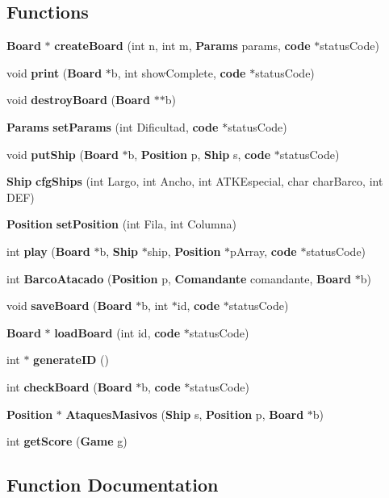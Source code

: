 \subsection*{Functions}
\begin{DoxyCompactItemize}
\item 
{\bf Board} $\ast$ {\bf create\+Board} (int n, int m, {\bf Params} params, {\bf code} $\ast$status\+Code)
\item 
void {\bf print} ({\bf Board} $\ast$b, int show\+Complete, {\bf code} $\ast$status\+Code)
\item 
void {\bf destroy\+Board} ({\bf Board} $\ast$$\ast$b)
\item 
{\bf Params} {\bf set\+Params} (int Dificultad, {\bf code} $\ast$status\+Code)
\item 
void {\bf put\+Ship} ({\bf Board} $\ast$b, {\bf Position} p, {\bf Ship} s, {\bf code} $\ast$status\+Code)
\item 
{\bf Ship} {\bf cfg\+Ships} (int Largo, int Ancho, int A\+T\+K\+Especial, char char\+Barco, int D\+EF)
\item 
{\bf Position} {\bf set\+Position} (int Fila, int Columna)
\item 
int {\bf play} ({\bf Board} $\ast$b, {\bf Ship} $\ast$ship, {\bf Position} $\ast$p\+Array, {\bf code} $\ast$status\+Code)
\item 
int {\bf Barco\+Atacado} ({\bf Position} p, {\bf Comandante} comandante, {\bf Board} $\ast$b)
\item 
void {\bf save\+Board} ({\bf Board} $\ast$b, int $\ast$id, {\bf code} $\ast$status\+Code)
\item 
{\bf Board} $\ast$ {\bf load\+Board} (int id, {\bf code} $\ast$status\+Code)
\item 
int $\ast$ {\bf generate\+ID} ()
\item 
int {\bf check\+Board} ({\bf Board} $\ast$b, {\bf code} $\ast$status\+Code)
\item 
{\bf Position} $\ast$ {\bf Ataques\+Masivos} ({\bf Ship} s, {\bf Position} p, {\bf Board} $\ast$b)
\item 
int {\bf get\+Score} ({\bf Game} g)
\end{DoxyCompactItemize}


\subsection{Function Documentation}
\label{funciones_8c_a61dcba4f41ed411eb45956ed8b5c174b} 
